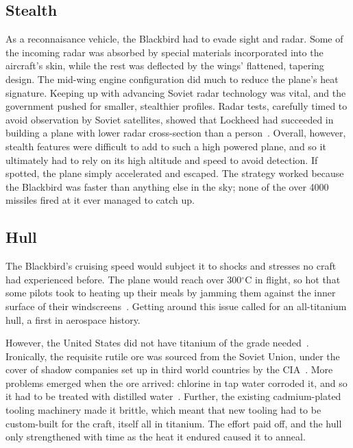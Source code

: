 \documentclass[12pt, draftclsnofoot, onecolumn]{IEEEtran}
\begin{document}
	\subsection{Stealth}
	
		As a reconnaisance vehicle, the Blackbird had to evade sight and radar. Some of the incoming radar was absorbed by special materials incorporated into the aircraft's skin, while the rest was deflected by the wings' flattened, tapering design. The mid-wing engine configuration did much to reduce the plane's heat signature. Keeping up with advancing Soviet radar technology was vital, and the government pushed for smaller, stealthier profiles. Radar tests, carefully timed to avoid observation by Soviet satellites, showed that Lockheed had succeeded in building a plane with lower radar cross-section than a person~\cite{creating}.
		Overall, however, stealth features were difficult to add to such a high powered plane, and so it ultimately had to rely on its high altitude and speed to avoid detection. If spotted, the plane simply accelerated and escaped. The strategy worked because the Blackbird was faster than anything else in the sky; none of the over 4000\cite{sleddriver} missiles fired at it ever managed to catch up.
		
	\subsection{Hull}
		The Blackbird's cruising speed would subject it to shocks and stresses no craft had experienced before. The plane would reach over 300$^\circ$C in flight, so hot that some pilots took to heating up their meals by jamming them against the inner surface of their windscreens~\cite{bbc}. Getting around this issue called for an all-titanium hull, a first in aerospace history.
		
		However, the United States did not have titanium of the grade needed~\cite{skunkworks}. Ironically, the requisite rutile ore was sourced from the Soviet Union, under the cover of shadow companies set up in third world countries by the CIA~\cite{bbc,skunkworks}. More problems emerged when the ore arrived: chlorine in tap water corroded it, and so it had to be treated with distilled water~\cite{skunkworks}. Further, the existing cadmium-plated tooling machinery made it brittle, which meant that new tooling had to be custom-built for the craft, itself all in titanium. The effort paid off, and the hull only strengthened with time as the heat it endured caused it to anneal.
		
\end{document}
